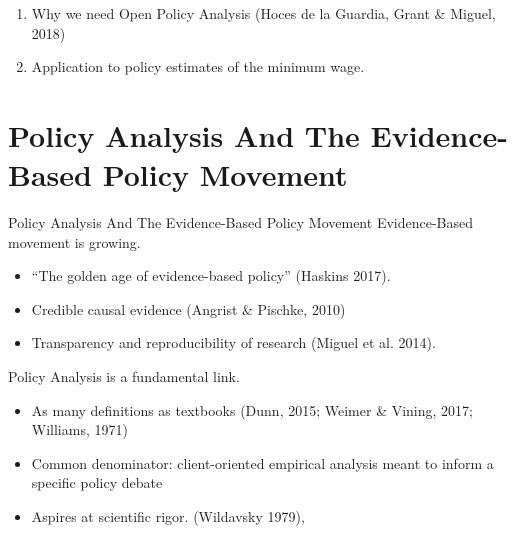 \documentclass{beamer}
\begin{document}

\begin{frame}
\begin{enumerate}
\item Why we need Open Policy Analysis (Hoces de la Guardia, Grant \& Miguel, 2018)
\bigskip
\item Application to policy estimates of the minimum wage. 
\end{enumerate}
\end{frame}




 
\section[Evidence Based]{Policy Analysis And The Evidence-Based Policy Movement}

\begin{frame}{Policy Analysis And The Evidence-Based Policy Movement}
Evidence-Based movement is growing. 
\begin{itemize}
\item ``The golden age of evidence-based policy'' (Haskins 2017).
\item Credible causal evidence (Angrist \& Pischke, 2010)
\item Transparency and reproducibility of research (Miguel et al. 2014).
\end{itemize}
\pause
Policy Analysis is a fundamental link. 
\begin{itemize}
\item As many definitions as textbooks (Dunn, 2015; Weimer \& Vining, 2017; Williams, 1971)
\item Common denominator: client-oriented empirical analysis meant to inform a specific policy debate
\item Aspires at scientific rigor. (Wildavsky 1979),
\end{itemize}
\end{frame} 
\end{document}
